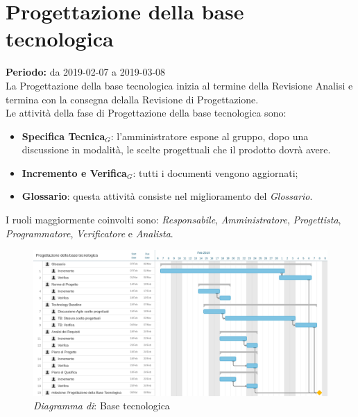 \section{Progettazione della base tecnologica}
\textbf{Periodo:} da 2019-02-07 a 2019-03-08\\
La Progettazione della base tecnologica inizia al termine della Revisione Analisi e termina con la consegna delalla Revisione di Progettazione.\\
Le attività della fase di Progettazione della base tecnologica sono:
\begin{itemize}
    \item \textbf{Specifica Tecnica$_{G}$}: l'amministratore espone al gruppo, dopo una discussione in modalità, le scelte progettuali che il prodotto dovrà avere.
    \item \textbf{Incremento e Verifica$_{G}$}: tutti i documenti vengono aggiornati;
    \item \textbf{Glossario}: questa attività consiste nel miglioramento del \textit{Glossario}.
\end{itemize}
I ruoli maggiormente coinvolti sono: \textit{Responsabile}, \textit{Amministratore}, \textit{Progettista}, \textit{Programmatore}, \textit{Verificatore} e \textit{Analista}.
\begin{figure} [h]
    \centering
    \includegraphics[scale=0.1]{./images/base_tecnologica.jpg}
    \caption{\textit{Diagramma di}: Base tecnologica }\label{}
\end{figure}
\newpage
